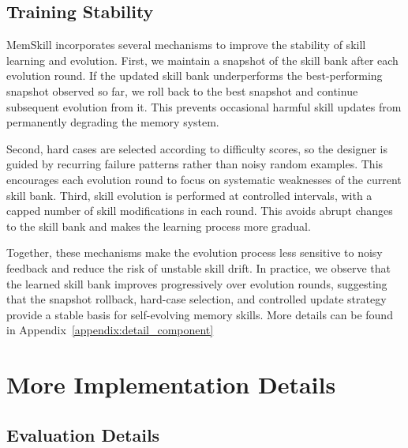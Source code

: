 





\subsection{Training Stability}
\label{appendix:train_stability}



MemSkill incorporates several mechanisms to improve the stability of skill learning and evolution. First, we maintain a snapshot of the skill bank after each evolution round. If the updated skill bank underperforms the best-performing snapshot observed so far, we roll back to the best snapshot and continue subsequent evolution from it. This prevents occasional harmful skill updates from permanently degrading the memory system.

Second, hard cases are selected according to difficulty scores, so the designer is guided by recurring failure patterns rather than noisy random examples. This encourages each evolution round to focus on systematic weaknesses of the current skill bank. Third, skill evolution is performed at controlled intervals, with a capped number of skill modifications in each round. This avoids abrupt changes to the skill bank and makes the learning process more gradual.

Together, these mechanisms make the evolution process less sensitive to noisy feedback and reduce the risk of unstable skill drift. In practice, we observe that the learned skill bank improves progressively over evolution rounds, suggesting that the snapshot rollback, hard-case selection, and controlled update strategy provide a stable basis for self-evolving memory skills.
More details can be found in Appendix~\ref{appendix:detail_component}







\section{More Implementation Details}
\label{appendix:imple_detail}




\subsection{Evaluation Details}
\label{appendix:exp_eval}

